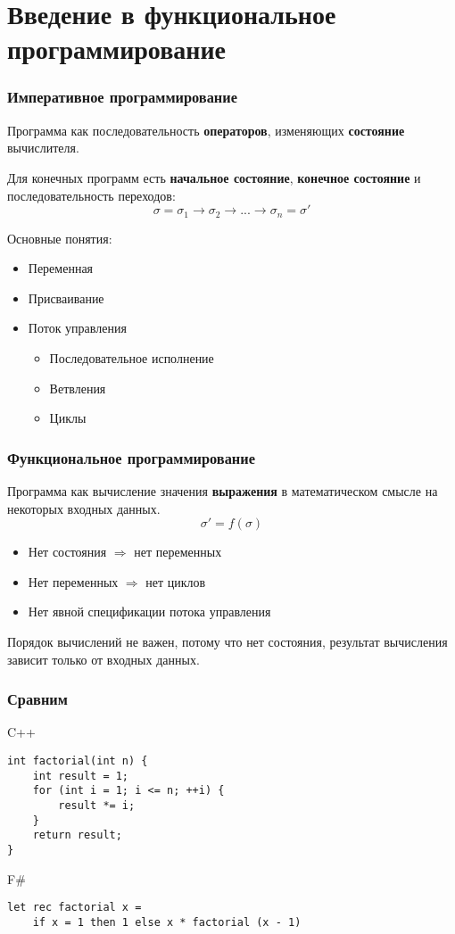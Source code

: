 \documentclass[xetex,mathserif,serif]{beamer}
\begin{document}
	\section{Введение в функциональное программирование}
	
	\begin{frame}
		\frametitle{Императивное программирование}
		Программа как последовательность \textbf{операторов}, изменяющих \textbf{состояние} вычислителя.

		Для конечных программ есть \textbf{начальное состояние}, \textbf{конечное состояние} и последовательность переходов:
		$$\sigma = \sigma_1 \rightarrow \sigma_2 \rightarrow ... \rightarrow \sigma_n = \sigma'$$
		
		Основные понятия:
		\begin{itemize}
			\item Переменная
			\item Присваивание
			\item Поток управления
			\begin{itemize}
				\item Последовательное исполнение
				\item Ветвления
				\item Циклы
			\end{itemize}
		\end{itemize}
	\end{frame}
	
	\begin{frame}
		\frametitle{Функциональное программирование}
		Программа как вычисление значения \textbf{выражения} в математическом смысле на некоторых входных данных.
		$$\sigma' = f(\sigma)$$
	
		\begin{itemize}
			\item Нет состояния $\Rightarrow$ нет переменных
			\item Нет переменных $\Rightarrow$ нет циклов
			\item Нет явной спецификации потока управления
		\end{itemize}
		Порядок вычислений не важен, потому что нет состояния, результат вычисления зависит только от входных данных.
	\end{frame}
	
	\begin{frame}[fragile]
		\frametitle{Сравним}
		\begin{alertblock}{C++}
			\begin{verbatim}
int factorial(int n) {
    int result = 1;
    for (int i = 1; i <= n; ++i) {
        result *= i;
    }
    return result;
}
            \end{verbatim}
		\end{alertblock}
		\begin{exampleblock}{F\#}
			\begin{verbatim}
let rec factorial x =
    if x = 1 then 1 else x * factorial (x - 1)
            \end{verbatim}
		\end{exampleblock}
\end{frame}
\end{document}

